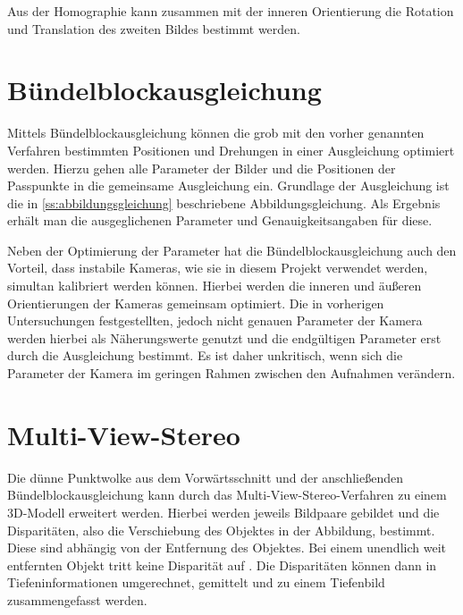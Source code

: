 \documentclass[./00PhotoBox.tex]{subfiles}
\begin{document}
Aus der Homographie kann zusammen mit der inneren Orientierung die Rotation und Translation des zweiten Bildes bestimmt werden.
\citep[vgl.][S. 74]{homography_decomposition}

\section{Bündelblockausgleichung}
\label{s:buendelblock}
Mittels Bündelblockausgleichung können die grob mit den vorher genannten Verfahren bestimmten Positionen und Drehungen in einer Ausgleichung optimiert werden. Hierzu gehen alle Parameter der Bilder und die Positionen der Passpunkte in die gemeinsame Ausgleichung ein. Grundlage der Ausgleichung ist die in \autoref{ss:abbildungsgleichung} beschriebene Abbildungsgleichung. Als Ergebnis erhält man die ausgeglichenen Parameter und Genauigkeitsangaben für diese. \citep[vgl.][S. 343ff]{luhmann}

Neben der Optimierung der Parameter hat die Bündelblockausgleichung auch den Vorteil, dass instabile Kameras, wie sie in diesem Projekt verwendet werden, simultan kalibriert werden können. Hierbei werden die inneren und äußeren Orientierungen der Kameras gemeinsam optimiert. Die in vorherigen Untersuchungen festgestellten, jedoch nicht genauen Parameter der Kamera werden hierbei als Näherungswerte genutzt und die endgültigen Parameter erst durch die Ausgleichung bestimmt. Es ist daher unkritisch, wenn sich die Parameter der Kamera im geringen Rahmen zwischen den Aufnahmen verändern. \citep[vgl.][S. 357f]{luhmann}


\section{Multi-View-Stereo}
Die dünne Punktwolke aus dem Vorwärtsschnitt und der anschließenden Bündel\-block\-ausgleichung kann durch das Multi-View-Stereo-Verfahren zu einem 3D-Modell erweitert werden. Hierbei werden jeweils Bildpaare gebildet und die Disparitäten, also die Verschiebung des Objektes in der Abbildung, bestimmt. Diese sind abhängig von der Entfernung des Objektes. Bei einem unendlich weit entfernten Objekt tritt keine Disparität auf \citep[vgl.][S. 313]{luhmann}. Die Disparitäten können dann in Tiefeninformationen umgerechnet, gemittelt und zu einem Tiefenbild zusammengefasst werden. \citep[vgl.][S. 505]{luhmann}
\end{document}
